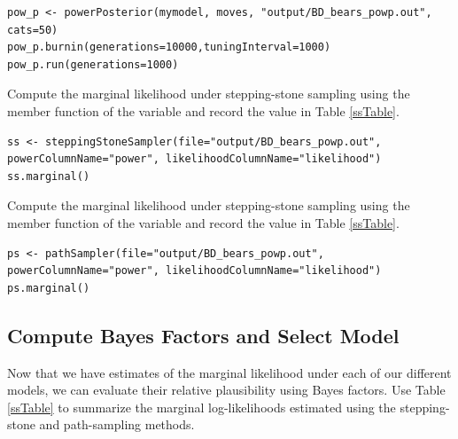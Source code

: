 {\tt \begin{snugshade*}
\begin{lstlisting}
pow_p <- powerPosterior(mymodel, moves, "output/BD_bears_powp.out", cats=50) 
pow_p.burnin(generations=10000,tuningInterval=1000)
pow_p.run(generations=1000)  
\end{lstlisting}
\end{snugshade*}}

Compute the marginal likelihood under stepping-stone sampling using the member function  of the  variable and record the value in Table \ref{ssTable}.
{\tt \small \begin{snugshade*}
\begin{lstlisting}
ss <- steppingStoneSampler(file="output/BD_bears_powp.out", powerColumnName="power", likelihoodColumnName="likelihood")
ss.marginal() 
\end{lstlisting}
\end{snugshade*}}

Compute the marginal likelihood under stepping-stone sampling using the member function  of the  variable and record the value in Table \ref{ssTable}.
{\tt \small \begin{snugshade*}
\begin{lstlisting}
ps <- pathSampler(file="output/BD_bears_powp.out", powerColumnName="power", likelihoodColumnName="likelihood")
ps.marginal() 
\end{lstlisting}
\end{snugshade*}}



\bigskip
\subsection{Compute Bayes Factors and Select Model}


Now that we have estimates of the marginal likelihood under each of our different models, we can evaluate their relative plausibility using Bayes factors.
Use Table \ref{ssTable} to summarize the marginal log-likelihoods estimated using the stepping-stone and path-sampling methods.

